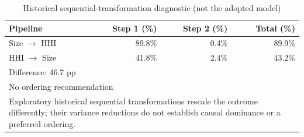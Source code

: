 \begin{table}[htbp]
\centering
\caption{Historical sequential-transformation diagnostic (not the adopted model)}
\label{tab:ordering_comparison}
\begin{tabular}{lrrr}
\toprule
\textbf{Pipeline} & \textbf{Step 1 (\%)} & \textbf{Step 2 (\%)} & \textbf{Total (\%)} \\
\midrule
Size $\to$ HHI & 89.8\% & 0.4\% & 89.9\% \\
HHI $\to$ Size & 41.8\% & 2.4\% & 43.2\% \\
\midrule
\multicolumn{4}{l}{Difference: 46.7 pp} \\
\multicolumn{4}{l}{No ordering recommendation} \\
\multicolumn{4}{p{12cm}}{Exploratory historical sequential transformations rescale the outcome differently; their variance reductions do not establish causal dominance or a preferred ordering.} \\
\bottomrule
\end{tabular}
\end{table}

